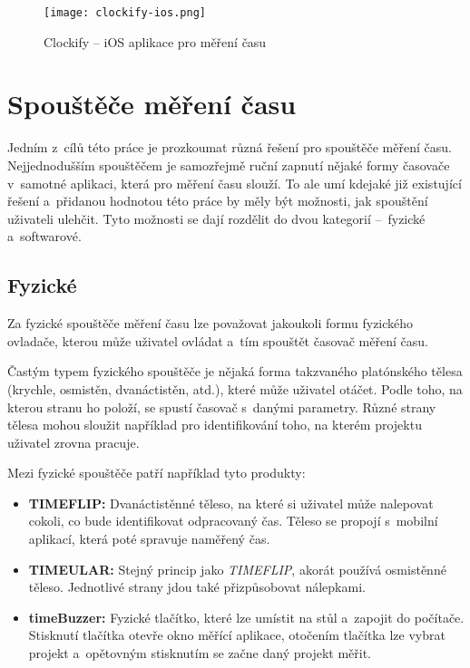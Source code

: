 \begin{figure}[h]
	\centering
	\texttt{[image: clockify-ios.png]}
	\caption{Clockify – iOS aplikace pro měření času \cite{clockify-ios}}
	\label{fig:clockify-ios}
\end{figure}

\section{Spouštěče měření času}\label{tracking-triggers}

Jedním z~cílů této práce je prozkoumat různá řešení pro spouštěče měření času. Nejjednodušším spouštěčem je samozřejmě ruční zapnutí nějaké formy časovače v~samotné aplikaci, která pro měření času slouží. To ale umí kdejaké již existující řešení a~přidanou hodnotou této práce by měly být možnosti, jak spouštění uživateli ulehčit. Tyto možnosti se dají rozdělit do dvou kategorií – fyzické a~softwarové.

\subsection{Fyzické}

Za fyzické spouštěče měření času lze považovat jakoukoli formu fyzického ovladače, kterou může uživatel ovládat a~tím spouštět časovač měření času.

Častým typem fyzického spouštěče je nějaká forma takzvaného platónského tělesa (krychle, osmistěn, dvanáctistěn, atd.), které může uživatel otáčet. Podle toho, na kterou stranu ho položí, se spustí časovač s~danými parametry. Různé strany tělesa mohou sloužit například pro identifikování toho, na kterém projektu uživatel zrovna pracuje.

Mezi fyzické spouštěče patří například tyto produkty:
\begin{itemize}
\item\textbf{TIMEFLIP:} Dvanáctistěnné těleso, na které si uživatel může nalepovat cokoli, co bude identifikovat odpracovaný čas. Těleso se propojí s~mobilní aplikací, která poté spravuje naměřený čas. \cite{timeflip}
\item\textbf{TIMEULAR:} Stejný princip jako \emph{TIMEFLIP}, akorát používá osmistěnné těleso. Jednotlivé strany jdou také přizpůsobovat nálepkami. \cite{timeular}
\item\textbf{timeBuzzer:} Fyzické tlačítko, které lze umístit na stůl a~zapojit do počítače. Stisknutí tlačítka otevře okno měřící aplikace, otočením tlačítka lze vybrat projekt a~opětovným stisknutím se začne daný projekt měřit. \cite{timebuzzer}
\end{itemize}


